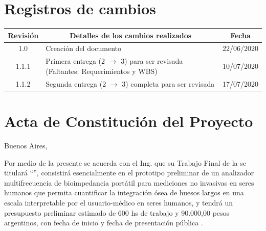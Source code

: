 \documentclass[11pt]{charter}
\begin{document}
\maketitle
\thispagestyle{empty}
\pagebreak


\thispagestyle{empty}
{\setlength{\parskip}{0pt}
\tableofcontents{}
}
\pagebreak


\section{Registros de cambios}
\label{sec:registro}


\begin{table}[ht]
\label{tab:registro}
\centering

\begin{tabularx}{\linewidth}{@{}|c|X|c|@{}}
\hline
\rowcolor[HTML]{C0C0C0} 
Revisión & \multicolumn{1}{c|}{\cellcolor[HTML]{C0C0C0}Detalles de los cambios realizados} & Fecha      \\ \hline
1.0      & Creación del documento                                                          & 22/06/2020 \\ \hline
1.1.1      & Primera entrega (2 $\rightarrow$ 3) para ser revisada (Faltantes: Requerimientos y WBS) & 10/07/2020 \\ \hline
1.1.2      & Segunda entrega (2 $\rightarrow$ 3) completa para ser revisada  & 17/07/2020 \\ \hline

\end{tabularx}
\end{table}

\pagebreak



\section{Acta de Constitución del Proyecto}
\label{sec:acta}

\begin{flushright}
Buenos Aires, \fechaInicioName
\end{flushright}

\vspace{2cm}

Por medio de la presente se acuerda con el Ing. \authorname\hspace{1px} que su Trabajo Final de la \degreename\hspace{1px} se titulará ``\ttitle'', consistirá esencialmente en el prototipo preliminar de un analizador multifrecuencia de bioimpedancia portátil para mediciones no invasivas en seres humanos que permita cuantificar la integración ósea de huesos largos en una escala interpretable por el usuario-médico en seres humanos, y tendrá un presupuesto preliminar estimado de 600 hs de trabajo y 90.000,00 pesos argentinos, con fecha de inicio \fechaInicioName\hspace{1px} y fecha de presentación pública \fechaFinalName.
\end{document}
